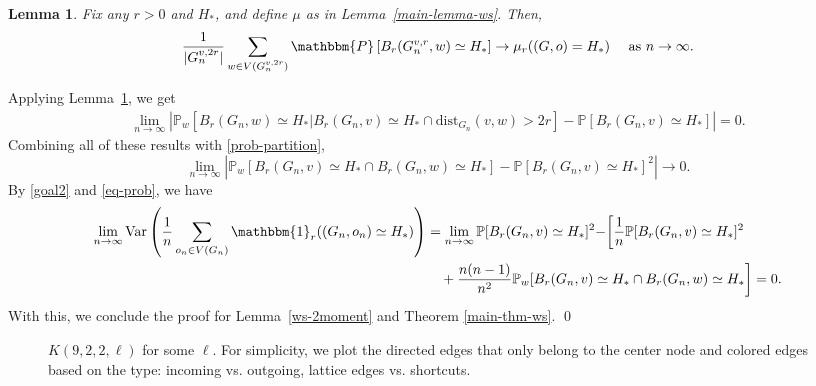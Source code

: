 \documentclass[10pt]{amsart}
\newtheorem{lemma}[theorem]{Lemma}
\begin{document}
\begin{lemma}\label{omitted-ws-lemma}
Fix any $r>0$ and $H_*$, and define $\mu$ as in Lemma~\ref{main-lemma-ws}. Then,
\begin{equation*} 
    \frac{1}{|G_n^{v,2r}|}\sum_{w\in V(G_n^{v,2r})}  \mathbbm{P} \left[B_r(G_n^{v,r}, w) \simeq H_* \right] \to\mu_r((G,o) =  H_*) \quad \text{ as $n \to \infty$.}
\end{equation*}  
\end{lemma}
Applying Lemma~\ref{omitted-ws-lemma}, we get
\begin{align}
   \lim_{n \to \infty} \left| \mathbb{P}_w[B_r(G_n, w) \simeq H_* | B_r(G_n, v) \simeq H_* \cap \text{dist}_{G_n}(v, w) > 2r] - \mathbb{P}[B_r(G_n, v) \simeq H_*] \right| = 0.
\end{align}
Combining all of these results with \eqref{prob-partition},
\begin{equation*}
    \lim_{n \to \infty} |\mathbb{P}_w [B_r(G_n, v) \simeq H_* \cap B_r(G_n, w) \simeq H_*] -  \mathbb{P}[B_r(G_n, v) \simeq H_*]^2 | \to 0.
\end{equation*}
By \eqref{goal2} and \eqref{eq-prob}, we have
\begin{align*}
    \lim_{n \to \infty} \text{Var}\left(\frac{1}{n} \sum_{o_n\in V(G_n)}  \mathbbm{1}_r((G_n,o_n)\simeq H_* )  \right)  &= \lim_{n \to \infty} \mathbb{P}[B_r(G_n, v) \simeq H_*]^2 - \biggr[ \frac{1}{n} \mathbb{P}[B_r(G_n, v) \simeq H_*]^2 \\
    &\quad + \frac{n(n-1)}{n^2} \mathbb{P}_w[B_r(G_n, v) \simeq H_* \cap B_r(G_n, w) \simeq H_* \biggr] = 0.
\end{align*}
With this, we conclude the proof for Lemma~\ref{ws-2moment} and Theorem \ref{main-thm-ws}. \qed

\begin{figure}
\centering
{}
    \caption{$K(9, 2, 2, \ell)$ for some $\ell$. For simplicity, we plot the directed edges that only belong to the center node and colored edges based on the type: incoming vs. outgoing, lattice edges vs. shortcuts.}
    \label{kleinberg-model}
\end{figure}
\end{document}
